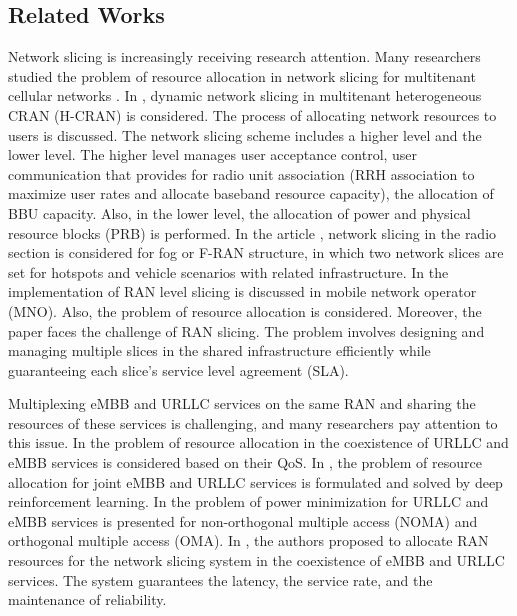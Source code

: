 \documentclass[conference]{IEEEtran}
\begin{document}
\subsection{Related Works}
Network slicing is increasingly receiving research attention.
Many researchers studied the problem of resource allocation in network slicing for multitenant cellular networks \cite{feng2020dynamic,lee2018dynamic,lee2016new}.
In \cite{lee2018dynamic}, dynamic network slicing in multitenant heterogeneous CRAN (H-CRAN) is considered. The process of allocating network resources to users is discussed. The network slicing scheme includes a higher level and the lower level. The higher level manages user acceptance control, user communication that provides for radio unit association (RRH association to maximize user rates and allocate baseband resource capacity), the allocation of BBU capacity. Also, in the lower level, the allocation of power and physical resource blocks (PRB) is performed.
In the article \cite{xiang2020realization}, network slicing in the radio section is considered for fog or F-RAN structure, in which two network slices are set for hotspots and vehicle scenarios with related infrastructure. In \cite{elayoubi20195g,d2020toward} the implementation of RAN level slicing is discussed in mobile network operator (MNO). Also, the problem of resource allocation is considered. Moreover, the paper faces the challenge of RAN slicing. The problem involves designing and managing multiple slices in the shared infrastructure efficiently while guaranteeing each slice's service level agreement (SLA).


Multiplexing eMBB and URLLC services on the same RAN and sharing the resources of these services is challenging, and many researchers pay attention to this issue.
In \cite{setayesh2020joint,yang2020should} the problem of resource allocation in the coexistence of URLLC and eMBB services is considered based on their QoS. 
In \cite{alsenwi2021intelligent}, the problem of resource allocation for joint eMBB and URLLC services is formulated and solved by deep reinforcement learning.
 In \cite{saggese2021power} the problem of power minimization for URLLC and eMBB services is presented for non-orthogonal multiple access (NOMA) and orthogonal multiple access (OMA).
 In \cite{korrai2020ran}, the authors proposed to allocate RAN resources for the network slicing system in the coexistence of eMBB and URLLC services. The system guarantees the latency, the service rate, and the maintenance of reliability.
\end{document}
